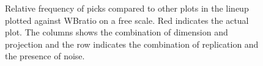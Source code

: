 \documentclass[12]{article}
\begin{document}
\begin{figure}[hbtp]
   \centering
       \caption{Relative frequency of picks compared to other plots in the lineup plotted against WBratio on a free scale. Red indicates the actual plot. The columns shows the combination of dimension and projection and the row indicates the combination of replication and the presence of noise.}
       \label{wbratio}
\end{figure}

\end{document}
